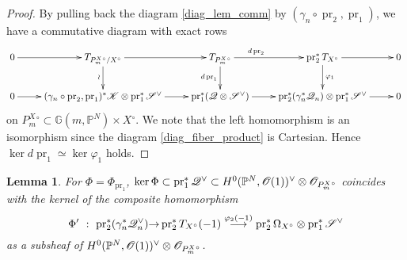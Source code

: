 \documentclass[a4paper,12pt]{amsart}
\theoremstyle{plain}
\newtheorem{lem}[lem]{Lemma}
\theoremstyle{definition}
\begin{document}
\begin{proof}
  By pulling back the diagram \autoref{diag_lem_comm} by $(\gamma_n \circ \operatorname{pr}_2 , \operatorname{pr}_1)  $,
  we have a commutative diagram with exact rows
  \[
  \xymatrix{   0 \ar[r] &T_{{{P_m^{X}}{^\circ}} /{X{^\circ}}} \ar[r] \ar[d]_{\wr} &  T_{{P_m^{X}}{^\circ}}  \ar[r]^(.35){d \operatorname{pr}_2} \ar[d]_{d \operatorname{pr}_1}
    &  \operatorname{pr}_2^* T_{X{^\circ}}  \ar[d]^{ \varphi_1} \ar[r]&0
    \\
    0 \ar[r] & (\gamma_n \circ \operatorname{pr}_2 , \operatorname{pr}_1)^* \mathscr{K} \otimes   \operatorname{pr}_1^* {\mathscr{S}}\spcheck  \ar[r] &  \operatorname{pr}_1^* ({\mathscr{Q}} \otimes  {\mathscr{S}}\spcheck)   \ar[r]
    &  \operatorname{pr}_2^* ( \gamma_n^*{\mathscr{Q}}_{n}) \otimes   \operatorname{pr}_1^*  {\mathscr{S}}\spcheck  \ar[r] &0
  } 
  \]
  on ${{P_m^{X}}{^\circ}} \subset {{\mathbb{G}}(m,{{\mathbb{P}}^N})} \times {X{^\circ}}$.
  We note that the left homomorphism is an isomorphism
  since the diagram \autoref{diag_fiber_product} is Cartesian.
  Hence $\ker d \operatorname{pr}_1 \simeq \ker \varphi_1$ holds.
\end{proof}

\begin{lem}\label{calim_Phi}
  For $\Phi = \Phi_{\operatorname{pr}_1}$,
  $\ker \Phi \subset \operatorname{pr}_1^* {\mathscr{Q}}^{\vee} \subset H^0({{\mathbb{P}}^N}, {\mathscr{O}}(1))\spcheck \otimes {\mathscr{O}}_{{P_m^{X}}{^\circ}}$ coincides with 
  the kernel of the composite homomorphism 
  \[
  \Phi' \ : \  \operatorname{pr}_2^*(\gamma_n^*{\mathscr{Q}}_{n}\spcheck) {\rightarrow} \operatorname{pr}_2^* T_{X{^\circ}}(-1) \stackrel{\varphi_ 2(-1)}{\longrightarrow}  \operatorname{pr}_2^* \Omega_{X{^\circ}} \otimes  \operatorname{pr}_1^*{\mathscr{S}}\spcheck
  \]
  as a subsheaf of $ H^0({{\mathbb{P}}^N}, {\mathscr{O}}(1))\spcheck \otimes {\mathscr{O}}_{{P_m^{X}}{^\circ}}$.
\end{lem}
\end{document}
